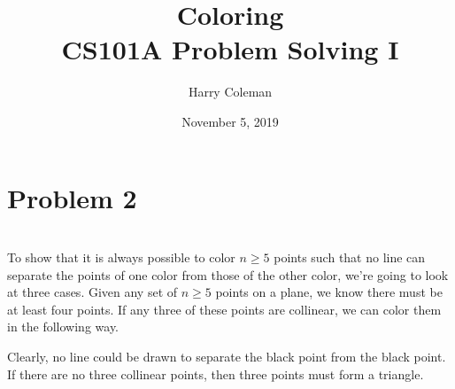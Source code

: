 \documentclass[12pt]{article}
\begin{document}
 
\title{Coloring\\
    \large CS101A Problem Solving I}
\author{Harry Coleman}
\date{November 5, 2019}

\maketitle

\section*{Problem 2}
\\

To show that it is always possible to color $n \geq 5$ points such that no line can separate the points of one color from those of the other color, we're going to look at three cases. Given any set of $n \geq 5$ points on a plane, we know there must be at least four points. If any three of these points are collinear, we can color them in the following way.

\begin{center}
\end{center}

Clearly, no line could be drawn to separate the black point from the black point. If there are no three collinear points, then three points must form a triangle.

\begin{center}
\end{center}
\end{document}
